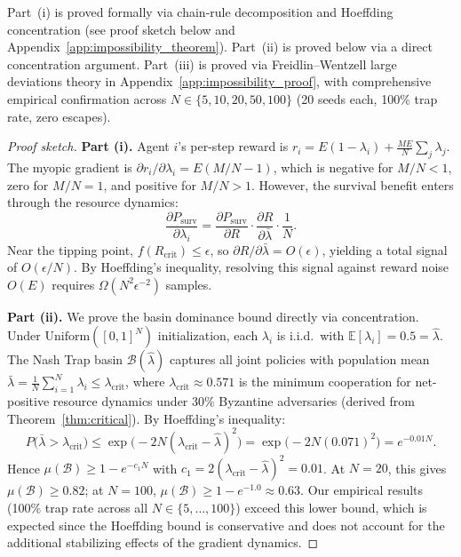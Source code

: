 \begin{remark}
Part~(i) is proved formally via chain-rule decomposition and Hoeffding concentration (see proof sketch below and Appendix~\ref{app:impossibility_theorem}).
Part~(ii) is proved below via a direct concentration argument.
Part~(iii) is proved via Freidlin--Wentzell large deviations theory in Appendix~\ref{app:impossibility_proof}, with comprehensive empirical confirmation across $N \in \{5, 10, 20, 50, 100\}$ (20 seeds each, 100\% trap rate, zero escapes).
\end{remark}

\begin{proof}[Proof sketch]
\textbf{Part (i).}
Agent $i$'s per-step reward is
$r_i = E(1 - \lambda_i) + \frac{ME}{N}\sum_{j} \lambda_j$.
The myopic gradient is $\partial r_i / \partial \lambda_i = E(M/N - 1)$,
which is negative for $M/N < 1$, zero for $M/N = 1$, and positive for $M/N > 1$.
However, the survival benefit enters through the resource dynamics:
\[
  \frac{\partial P_{\mathrm{surv}}}{\partial \lambda_i}
  = \frac{\partial P_{\mathrm{surv}}}{\partial R}
    \cdot \frac{\partial R}{\partial \bar{\lambda}}
    \cdot \frac{1}{N}.
\]
Near the tipping point, $f(R_{\mathrm{crit}}) \leq \epsilon$,
so $\partial R / \partial \bar{\lambda} = O(\epsilon)$,
yielding a total signal of $O(\epsilon / N)$.
By Hoeffding's inequality, resolving this signal against reward noise $O(E)$
requires $\Omega(N^2 \epsilon^{-2})$ samples.

\textbf{Part (ii).}
We prove the basin dominance bound directly via concentration.
Under $\mathrm{Uniform}([0,1]^N)$ initialization, each $\lambda_i$ is i.i.d.\ with $\mathbb{E}[\lambda_i] = 0.5 = \hat{\lambda}$.
The Nash Trap basin $\mathcal{B}(\hat{\lambda})$ captures all joint policies with population mean
$\bar{\lambda} = \frac{1}{N}\sum_{i=1}^N \lambda_i \leq \lambda_{\mathrm{crit}}$,
where $\lambda_{\mathrm{crit}} \approx 0.571$ is the minimum cooperation for net-positive resource dynamics under 30\% Byzantine adversaries (derived from Theorem~\ref{thm:critical}).
By Hoeffding's inequality:
\[
  P\bigl(\bar{\lambda} > \lambda_{\mathrm{crit}}\bigr)
  \leq \exp\!\bigl(-2N(\lambda_{\mathrm{crit}} - \hat{\lambda})^2\bigr)
  = \exp\!\bigl(-2N(0.071)^2\bigr)
  = e^{-0.01N}.
\]
Hence $\mu(\mathcal{B}) \geq 1 - e^{-c_1 N}$ with $c_1 = 2(\lambda_{\mathrm{crit}} - \hat{\lambda})^2 = 0.01$.
At $N=20$, this gives $\mu(\mathcal{B}) \geq 0.82$; at $N=100$, $\mu(\mathcal{B}) \geq 1 - e^{-1.0} \approx 0.63$.
Our empirical results (100\% trap rate across all $N \in \{5, \ldots, 100\}$) exceed this lower bound,
which is expected since the Hoeffding bound is conservative and does not account for the additional stabilizing effects of the gradient dynamics.


\end{proof}
